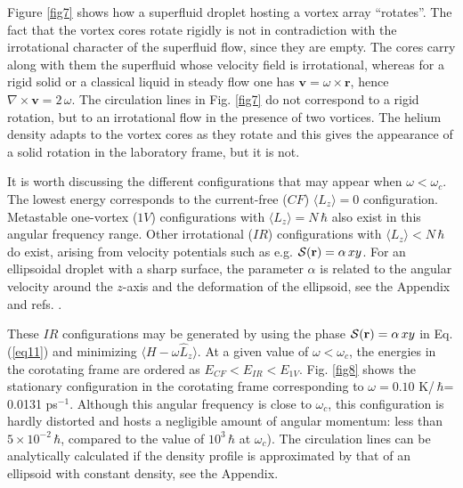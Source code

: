 Figure \ref{fig7} shows how a superfluid droplet 
hosting a vortex array ``rotates''. The fact that the vortex 
cores rotate rigidly is not in 
contradiction with the irrotational character 
of the superfluid flow, since they are empty.  The cores carry 
along with them the superfluid whose velocity field  is irrotational,
whereas for a rigid solid or a classical liquid in steady flow 
 one has $\mathbf{v} = \omega \times \mathbf{r}$,  hence $\nabla \times \mathbf{v} = 2\, \omega$. 
The circulation lines in Fig. \ref{fig7} do not correspond 
to a rigid rotation, but to  an irrotational flow in the presence of two vortices. 
The helium density adapts to the vortex cores as they 
rotate and this gives the appearance of a solid 
rotation in the laboratory frame, but it is not. 

It is worth discussing the different  configurations 
that may appear when $\omega < \omega_c$. The lowest energy  
corresponds to the current-free ($CF$) $\langle L_z \rangle =0$ configuration. 
Metastable one-vortex ($1V$) configurations  with 
$\langle L_z \rangle  =N \, \hbar$ also exist in this 
angular frequency range.\cite{Anc14,Anc15} Other irrotational ($IR$) configurations
with $\langle L_z \rangle   < N \, \hbar$ do exist, arising  
from  velocity potentials  such as e.g. 
${\cal S}(\mathbf{r}) = \alpha \,xy$. For an  ellipsoidal droplet with a sharp 
surface, the parameter $\alpha$ is related to the 
angular velocity around the $z$-axis and the deformation 
of the ellipsoid, see the Appendix and refs. \cite{Sei94,Boh75,Rec01}. 

These $IR$ configurations may be generated by using  
the phase ${\cal S}(\mathbf{r}) = \alpha \,xy$ in  
Eq. (\ref{eq11}) and minimizing $\langle H - \omega \hat{L}_z \rangle$. 
At a given value of $\omega < \omega_c$, the energies in the 
corotating frame  are ordered as $E_{CF} < E_{IR} < E_{1V}$.
Fig. \ref{fig8} shows the stationary configuration in the 
corotating frame corresponding to  $\omega= 0.10$ K/\,$\hbar$= 0.0131 ps$^{-1}$.
Although this angular frequency is close to  $\omega_c$,
this configuration is hardly distorted and hosts a negligible amount
of angular momentum: less than $5\times 10^{-2}  \, \hbar$,  compared to the value  of $10^3 \,  \hbar$ at $\omega_c$). The circulation lines 
can be analytically calculated if the density 
profile is approximated by that of an ellipsoid with constant density, see the Appendix. 
 
